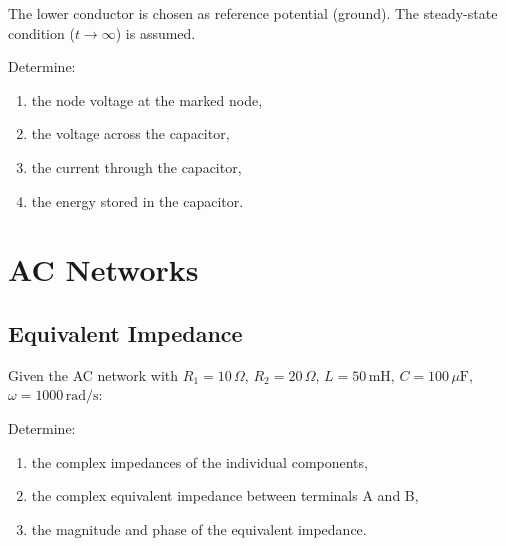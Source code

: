 \documentclass[a4paper,12pt]{article}
\newif\ifshowsolutions
\begin{document}
The lower conductor is chosen as reference potential (ground). The steady-state condition ($t \rightarrow \infty$) is assumed.

Determine:

\begin{enumerate}
  \item the node voltage at the marked node,
  \item the voltage across the capacitor,
  \item the current through the capacitor,
  \item the energy stored in the capacitor.
\end{enumerate}

\ifshowsolutions
Solution:
\[
\frac{V - U}{R_1} + \frac{V - 0}{R_2} = 0
\]
\[
2(V - 20) + V = 0
\]
\[
V = \frac{40}{3} \approx 13.33\,\text{V}
\]
\[
U_C = V - 0 = 13.33\,\text{V}
\]
\[
i_C = C \frac{du_C}{dt} = 0
\]
\[
W = \frac{1}{2} C U_C^2 \approx 8.9\,\text{mJ}
\]
\fi

\newpage

\section{AC Networks}

\subsection{Equivalent Impedance}

Given the AC network with  $R_1 = 10\,\Omega$, $R_2 = 20\,\Omega$, $L = 50\,\mathrm{mH}$, $C = 100\,\mu\mathrm{F}$, $\omega = 1000\,\mathrm{rad/s}$:

\begin{center}
\end{center}

Determine:

\begin{enumerate}
  \item the complex impedances of the individual components,
  \item the complex equivalent impedance between terminals A and B,
  \item the magnitude and phase of the equivalent impedance.
\end{enumerate}
\end{document}
